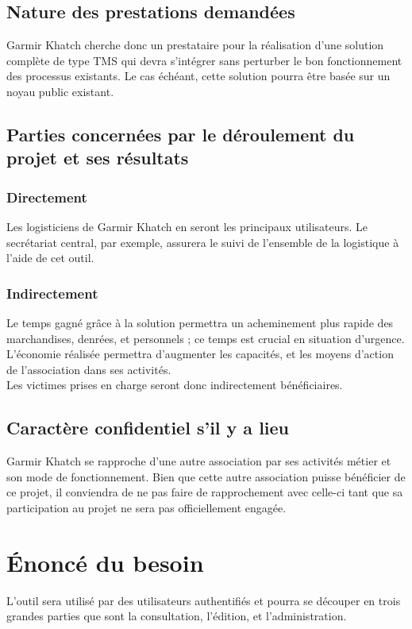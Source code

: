 \subsection{Nature des prestations demandées}
Garmir Khatch cherche donc un prestataire pour la réalisation d'une solution complète de type TMS qui devra s'intégrer sans perturber le bon fonctionnement des processus existants. Le cas échéant, cette solution pourra être basée sur un noyau public existant.

\subsection{Parties concernées par le déroulement du projet et ses résultats}

\subsubsection{Directement}
Les logisticiens de Garmir Khatch en seront les principaux utilisateurs. Le secrétariat central, par exemple, assurera le suivi de l'ensemble de la logistique à l'aide de cet outil.

\subsubsection{Indirectement}
Le temps gagné grâce à la solution permettra un acheminement plus rapide des marchandises, denrées, et personnels ; ce temps est crucial en situation d'urgence. L'économie réalisée permettra d'augmenter les capacités, et les moyens d'action de l'association dans ses activités.
\\
Les victimes prises en charge seront donc indirectement bénéficiaires.

\subsection{Caractère confidentiel s'il y a lieu}
Garmir Khatch se rapproche d'une autre association par ses activités métier et son mode de fonctionnement. Bien que cette autre association puisse bénéficier de ce projet, il conviendra de ne pas faire de rapprochement avec celle-ci tant que sa participation au projet ne sera pas officiellement engagée.

\section{Énoncé du besoin}
L'outil sera utilisé par des utilisateurs authentifiés et pourra se découper en trois grandes parties que sont la consultation, l'édition, et l'administration.

